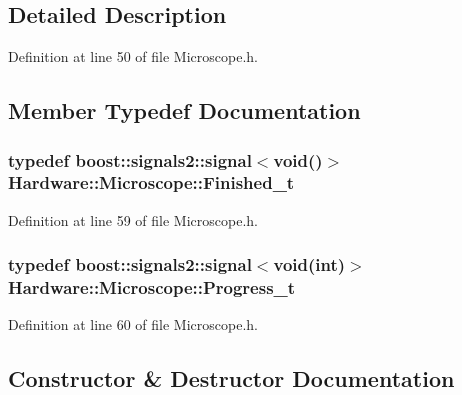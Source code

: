 \subsection{Detailed Description}


Definition at line 50 of file Microscope.\+h.



\subsection{Member Typedef Documentation}
\hypertarget{class_hardware_1_1_microscope_a40676fa031cfc911b9b180f902f1e00d}{}
\subsubsection[{Finished\+\_\+t}]{\setlength{\rightskip}{0pt plus 5cm}typedef boost\+::signals2\+::signal$<$void()$>$ {\bf Hardware\+::\+Microscope\+::\+Finished\+\_\+t}}\label{class_hardware_1_1_microscope_a40676fa031cfc911b9b180f902f1e00d}


Definition at line 59 of file Microscope.\+h.

\hypertarget{class_hardware_1_1_microscope_a2b031f9b1c8b0294da0c989dbf728d79}{}
\subsubsection[{Progress\+\_\+t}]{\setlength{\rightskip}{0pt plus 5cm}typedef boost\+::signals2\+::signal$<$void(int)$>$ {\bf Hardware\+::\+Microscope\+::\+Progress\+\_\+t}}\label{class_hardware_1_1_microscope_a2b031f9b1c8b0294da0c989dbf728d79}


Definition at line 60 of file Microscope.\+h.



\subsection{Constructor \& Destructor Documentation}
\hypertarget{class_hardware_1_1_microscope_a335599c313acd6f5e2f94c09a3475620}{}
